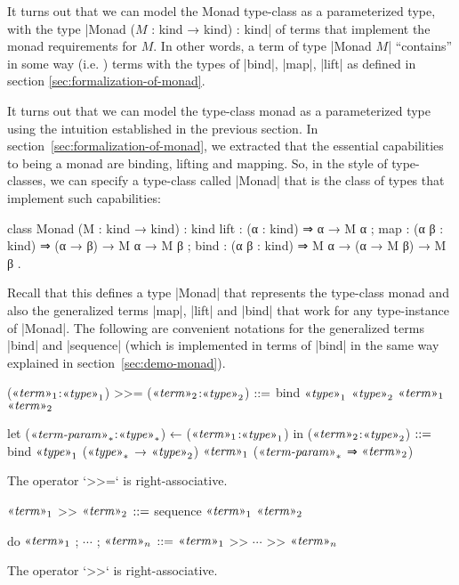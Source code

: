 It turns out that we can model the Monad type-class as a parameterized type, with the type \code|Monad ($M$ : kind → kind) : kind| of terms that implement the monad requirements for $M$.
In other words, a term of type \code|Monad $M$| ``contains'' in some way (i.e. ) terms with the types of \code|bind|, \code|map|, \code|lift| as defined in section \ref{sec:formalization-of-monad}.

It turns out that we can model the type-class monad as a parameterized type using the intuition established in the previous section.
In section~\ref{sec:formalization-of-monad}, we extracted that the essential capabilities to being a monad are binding, lifting and mapping.
So, in the style of type-classes, we can specify a type-class called \code|Monad| that is the class of types that implement such capabilities:
\begin{program}
class Monad (M : kind → kind) : kind
  { lift : (α : kind)   ⇒ α → M α
  ; map  : (α β : kind) ⇒ (α → β) → M α → M β
  ; bind : (α β : kind) ⇒ M α → (α → M β) → M β }.
\end{program}
Recall that this defines a type \code|Monad| that represents the type-class monad and also the generalized terms \code|map|, \code|lift| and \code|bind| that work for any type-instance of \code|Monad|.
The following are convenient notations for the generalized terms \code|bind| and \code|sequence| (which is implemented in terms of \code|bind| in the same way explained in section~\ref{sec:demo-monad}).
\begin{notational}[caption={Notations for binding.}]
($\mvar{term}_1$:$\mvar{type}_1$) >>= ($\mvar{term}_2$:$\mvar{type}_2$)
  $\syneq$
    bind $\mvar{type}_1$ $\mvar{type}_2$ $\mvar{term}_1$ $\mvar{term}_2$

let ($\mvar{term-param}_*$:$\mvar{type}_*$) ← ($\mvar{term}_1$:$\mvar{type}_1$) in ($\mvar{term}_2$:$\mvar{type}_2$)
  $\syneq$
    bind $\mvar{type}_1$ ($\mvar{type}_*$ → $\mvar{type}_2$) $\mvar{term}_1$ ($\mvar{term-param}_*$ ⇒ $\mvar{term}_2$)
\end{notational}
The operator \code`>>=` is right-associative.

\begin{notational}[caption={Notations for sequencing}]
$\mvar{term}_1$ >> $\mvar{term}_2$   $\syneq$   sequence $\mvar{term}_1$ $\mvar{term}_2$

do{ $\mvar{term}_1$ ; $\cdots$ ; $\mvar{term}_n$ }   $\syneq$   $\mvar{term}_1$ >> $\cdots$ >> $\mvar{term}_n$
\end{notational}
The operator \code`>>` is right-associative.

